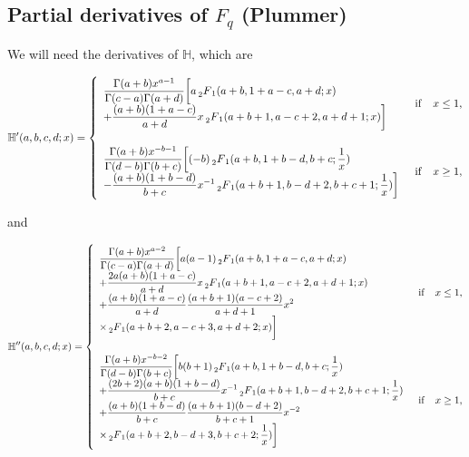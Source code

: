 \documentclass[11pt]{article}
\newcommand{\Fq}{F_{q}}
\newcommand{\mH}{\mathbb{H}}
\newcommand{\HG}{\prescript{}{2}F_{1}}
\begin{document}
\begin{appendices}
\section{Partial derivatives of $\Fq$ (Plummer)}
\label{app:Fq_derivatives}
We will need the derivatives of $\mH$, which are


\begin{equation}
  \mH'(a,b,c,d;x)=\begin{cases}
  \begin{array}{l}
    \displaystyle{\frac{\Gamma(a+b)x^{a-1}}{\Gamma(c-a)\Gamma(a+d)}\bigg[a\HG(a+b,1+a-c,a+d;x)} \\
      \displaystyle{+\frac{(a+b)(1+a-c)}{a+d}x \HG(a+b+1,a-c+2,a+d+1;x)\bigg]}
  \end{array} & {\rm{if}} \quad x\leq1 , \\
  {}&{}\\
  \begin{array}{l}
    \displaystyle{\frac{\Gamma(a+b)x^{-b-1}}{\Gamma(d-b)\Gamma(b+c)}\bigg[(-b)\HG(a+b,1+b-d,b+c;\frac{1}{x})} \\
      \displaystyle{-\frac{(a+b)(1+b-d)}{b+c}x^{-1}\HG(a+b+1,b-d+2,b+c+1;\frac{1}{x})\bigg]}
    \end{array} &{\rm{if}} \quad x\geq1 ,
\end{cases}
\label{eq:dHdx}
\end{equation}

and

\begin{equation}
  \mH''(a,b,c,d;x)=\begin{cases}
  \begin{array}{l}
    \displaystyle{\frac{\Gamma(a+b)x^{a-2}}{\Gamma(c-a)\Gamma(a+d)}\bigg[a(a-1)\HG(a+b,1+a-c,a+d;x)} \\
        \displaystyle{+\frac{2a(a+b)(1+a-c)}{a+d}x\HG(a+b+1,a-c+2,a+d+1;x)}\\
        \displaystyle{+\frac{(a+b)(1+a-c)}{a+d}\frac{(a+b+1)(a-c+2)}{a+d+1}x^{2}} \\
        \displaystyle{\times \HG(a+b+2,a-c+3,a+d+2;x)\bigg]}
  \end{array} & {\rm{if}} \quad x\leq1 , \\
  {}&{}\\
  \begin{array}{l}
    \displaystyle{\frac{\Gamma(a+b)x^{-b-2}}{\Gamma(d-b)\Gamma(b+c)}\bigg[b(b+1)\HG(a+b,1+b-d,b+c;\frac{1}{x})} \\
      \displaystyle{+\frac{(2b+2)(a+b)(1+b-d)}{b+c}x^{-1}\HG(a+b+1,b-d+2,b+c+1;\frac{1}{x})}\\
      \displaystyle{+\frac{(a+b)(1+b-d)}{b+c}\frac{(a+b+1)(b-d+2)}{b+c+1}x^{-2}} \\
      \displaystyle{\times \HG(a+b+2,b-d+3,b+c+2;\frac{1}{x})\bigg]}
    \end{array} &{\rm{if}} \quad x\geq1 ,
\end{cases}
\label{eq:d2Hdx2}
\end{equation}


\end{appendices}
\end{document}
